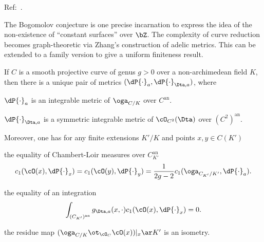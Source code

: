 \documentclass[article, a4paper, twoside]{universal}
\begin{document}
\confighead{}{}{}


Ref:~\cite{Yuan2021Bigness,Zhang1993}.

The Bogomolov conjecture is one precise incarnation to express the idea of the non-existence of ``constant surfaces'' over $\bZ$. The complexity of curve reduction becomes graph-theoretic via Zhang's construction of adelic metrics. This can be extended to a family version to give a uniform finiteness result.



\begin{thm}
	If $C$ is a smooth projective curve of genus $g>0$ over a non-archimedean field $K$, then there is a unique pair of metrics $(\dP{\cdot}_{a},\dP{\cdot}_{\Dta,a})$, where
	\begin{itm}
		\item $\dP{\cdot}_{a}$ is an integrable metric of $\oga_{C/K}$ over $C^{\mathrm{an}}$.
		\item $\dP{\cdot}_{\Dta,a}$ is a symmetric integrable metric of $\cO_{C^{2}}(\Dta)$ over $(C^{2})^{\mathrm{an}}$.
	\end{itm}
	Moreover, one has for any finite extensions $K'/K$ and points $x,y\in C(K')$
	\begin{itm}
		\item the equality of Chambert-Loir measures over $C_{K'}^{\mathrm{an}}$
		\[
			c_{1}(\cO(x),\dP{\cdot}_{x})=c_{1}(\cO(y),\dP{\cdot}_{y})=\frac{1}{2g-2}c_{1}(\oga_{C_{K'}/K'},\dP{\cdot}_{a}).
		\]
		\item the equality of an integration
		\[
			\int_{(C_{K'})^{\mathrm{an}}}g_{\Dta,a}(x,\cdot)c_{1}(\cO(x),\dP{\cdot}_{x})=0.
		\]
		\item the residue map $(\oga_{C/K}\ot_{\cO_{C}}\cO(x))|_{x}\ar K'$ is an isometry.
	\end{itm}
\end{thm}
\end{document}
